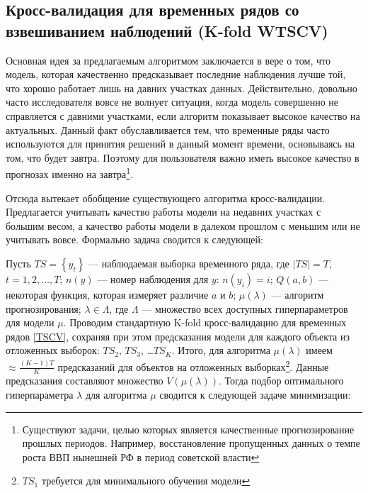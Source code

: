 \documentclass[a4paper, 14pt]{article}
\begin{document}
\subsection{Кросс-валидация для временных рядов со взвешиванием наблюдений (K-fold WTSCV)}

Основная идея за предлагаемым алгоритмом заключается в вере о том, что модель, которая качественно предсказывает последние наблюдения лучше той, что хорошо работает лишь на давних участках данных. Действительно, довольно часто исследователя вовсе не волнует ситуация, когда модель совершенно не справляется с давними участками, если алгоритм показывает высокое качество на актуальных. Данный факт обуславливается тем, что временные ряды часто используются для принятия решений в данный момент времени, основываясь на том, что будет завтра. Поэтому для пользователя важно иметь высокое качество в прогнозах именно на завтра\footnote{Существуют задачи, целью которых является качественные прогнозирование прошлых периодов. Например, восстановление пропущенных данных о темпе роста ВВП нынешней РФ в период советской власти}. 

Отсюда вытекает обобщение существующего алгоритма кросс-валидации. Предлагается учитывать качество работы модели на недавних участках с большим весом, а качество работы модели в далеком прошлом с меньшим или не учитывать вовсе. Формально задача сводится к следующей:

\noindent Пусть $TS = \left\{y_t\right\}$ --- наблюдаемая выборка временного ряда, где $\left|TS\right| = T$, $t = 1, 2, \dots,  T$; $n(y)$ --- номер наблюдения для $y$: $n(y_i) = i$; $Q(a,b)$ --- некоторая функция, которая измеряет различие $a$ и $b$; $\mu (\lambda)$ --- алгоритм прогнозирования; $\lambda \in \Lambda$, где $\Lambda$ --- множество всех доступных гиперпараметров для модели $\mu$. Проводим стандартную K-fold кросс-валидацию для временных рядов \eqref{TSCV}, сохраняя при этом предсказания модели для каждого объекта из отложенных выборок: $TS_2$, $TS_3$, \dots $TS_K$. Итого, для алгоритма $\mu(\lambda)$ имеем $\approx \frac{(K-1)T}{K}$ предсказаний для объектов на отложенных выборках\footnote{$TS_1$ требуется для минимального обучения модели}. Данные предсказания составляют множество $V(\mu(\lambda))$. Тогда подбор оптимального гиперпараметра $\lambda$ для алгоритма $\mu$ сводится к следующей задаче минимизации:
\end{document}
